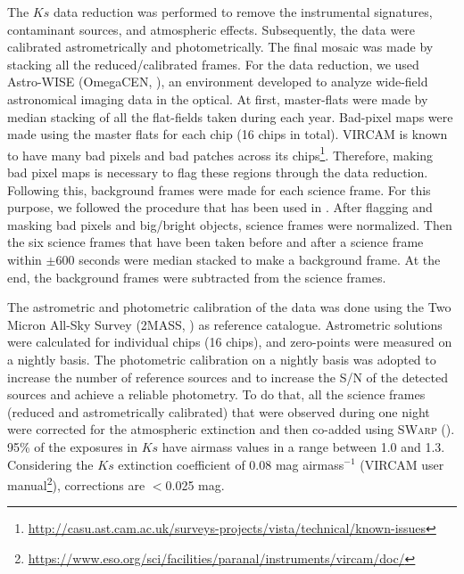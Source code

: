 \documentclass[fleqn,usenatbib]{mnras}
\begin{document}
The $Ks$ data reduction was performed to remove the instrumental signatures, contaminant sources, and atmospheric effects. Subsequently, the data were calibrated astrometrically and photometrically. The final mosaic was made by stacking all the reduced/calibrated frames. For the data reduction, we used Astro-WISE (OmegaCEN, \citealp{aw2,McFarland-2013}), an environment developed to analyze wide-field astronomical imaging data in the optical. At first, master-flats were made by median stacking of all the flat-fields taken during each year. Bad-pixel maps were made using the master flats for each chip (16 chips in total). VIRCAM is known to have many bad pixels and bad patches across its chips\footnote{ \url{http://casu.ast.cam.ac.uk/surveys-projects/vista/technical/known-issues}}. Therefore, making bad pixel maps is necessary to flag these regions through the data reduction. Following this, background frames were made for each science frame. For this purpose, we followed the procedure that has been used in \citealp{venhola2018}. After flagging and masking bad pixels and big/bright objects, science frames were normalized. Then the six science frames that have been taken before and after a science frame within $\pm$600 seconds were median stacked to make a background frame. At the end, the background frames were subtracted from the science frames.

The astrometric and photometric calibration of the data was done using the Two Micron All-Sky Survey (2MASS, \citealp{2mass}) as reference catalogue. Astrometric solutions were calculated for individual chips (16 chips), and zero-points were measured on a nightly basis. The photometric calibration on a nightly basis was adopted to increase the number of reference sources and to increase the S/N of the detected sources and achieve a reliable photometry. To do that, all the science frames (reduced and astrometrically calibrated) that were observed during one night were corrected for the atmospheric extinction and then co-added using \textsc{SWarp} (\citealp{swarp}). 95\% of the exposures in $Ks$ have airmass values in a range between 1.0 and 1.3. Considering the $Ks$ extinction coefficient of 0.08 mag airmass$^{-1}$ (VIRCAM user manual\footnote{\url{https://www.eso.org/sci/facilities/paranal/instruments/vircam/doc/}}), corrections are $<$0.025 mag.
\end{document}
